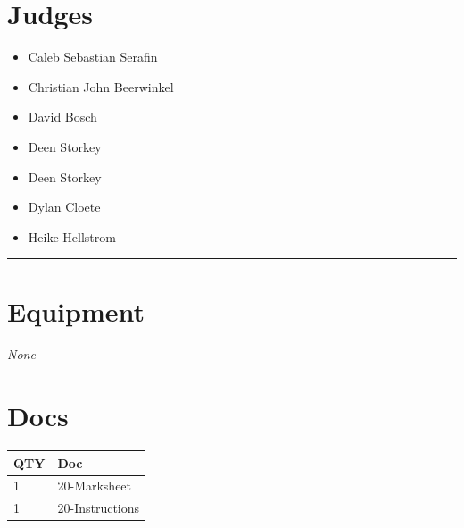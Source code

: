 \documentclass[10pt]{article}
\begin{document}
		\section*{\faUsers \: Judges}

		

	\begin{multicols}{2}

		\begin{itemize}
									\item Caleb Sebastian Serafin
									\item Christian John Beerwinkel
									\item David Bosch
									\item Deen Storkey
						\end{itemize}

		\vfill\null
		\columnbreak

		\begin{itemize}
									\item Deen Storkey
									\item Dylan Cloete
									\item Heike Hellstrom
						\end{itemize}

		\vfill\null

		\end{multicols}



			\vspace{0.5cm}
	\hrule
	\vspace{0.5cm}

	\begin{multicols}{2}

		\section*{\faWrench \: Equipment}

				\textit{None}
		
		\vfill\null
		\columnbreak

			\section*{\faFile \: Docs}
		 	\begin{center}
			\begin{tabular}{p{2cm}p{4cm}}

			\textbf{QTY} & \textbf{Doc} \\\toprule
										1&20-Marksheet\\\midrule
										1&20-Instructions\\\midrule
							\end{tabular}
			\end{center}
	

		\vfill\null

		\end{multicols}
\end{document}
